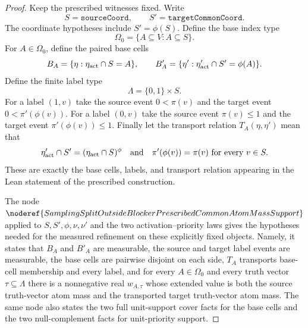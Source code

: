 \begin{proof}
Keep the prescribed witnesses fixed.  Write
\[
  S=\texttt{sourceCoord},\qquad S'=\texttt{targetCommonCoord}.
\]
The coordinate hypotheses include \(S'=\phi(S)\).  Define the base index type
\[
  \Omega_0=\{A\subseteq V:A\subseteq S\}.
\]
For \(A\in\Omega_0\), define the paired base cells
\[
  B_A=\{\eta:\eta_{\rm act}\cap S=A\},\qquad
  B'_A=\{\eta':\eta'_{\rm act}\cap S'= \phi(A)\}.
\]
Define the finite label type
\[
  \Lambda=\{0,1\}\times S.
\]
For a label \((1,v)\) take the source event \(0<\pi(v)\) and the target event
\(0<\pi'(\phi(v))\).  For a label \((0,v)\) take the source event
\(\pi(v)\le1\) and the target event \(\pi'(\phi(v))\le1\).  Finally let the
transport relation \(T_A(\eta,\eta')\) mean that
\[
  \eta'_{\rm act}\cap S'=(\eta_{\rm act}\cap S)^\phi
  \quad\text{and}\quad
  \pi'(\phi(v))=\pi(v)\text{ for every }v\in S.
\]
These are exactly the base cells, labels, and transport relation appearing in
the Lean statement of the prescribed construction.

The node
\(\noderef{SamplingSplitOutsideBlockerPrescribedCommonAtomMassSupport}\)
applied to \(S,S',\phi,\nu,\nu'\) and the two activation--priority laws gives
the hypotheses needed for the measured refinement on these explicitly fixed
objects.  Namely, it states that \(B_A\) and \(B'_A\) are measurable, the
source and target label events are measurable, the base cells are pairwise
disjoint on each side, \(T_A\) transports base-cell membership and every
label, and for every \(A\in\Omega_0\) and every truth vector
\(\tau\subseteq\Lambda\) there is a nonnegative real \(w_{A,\tau}\) whose
extended value is both the source truth-vector atom mass and the transported
target truth-vector atom mass.  The same node also states the two full
unit-support cover facts for the base cells and the two null-complement facts
for unit-priority support.


\end{proof}
